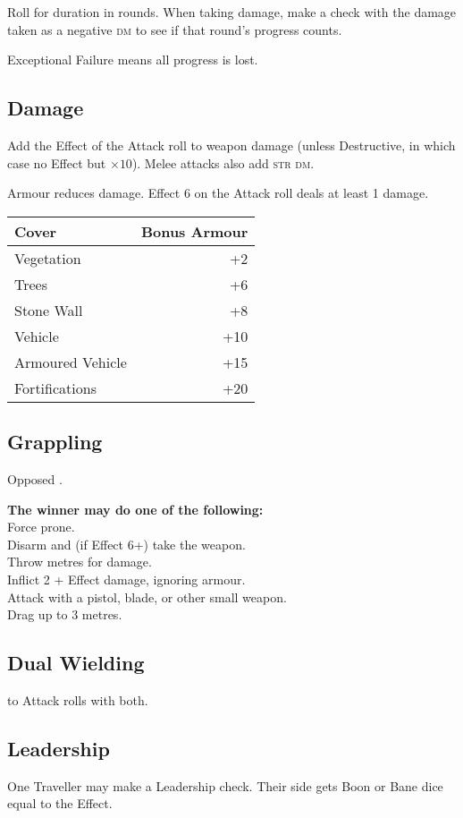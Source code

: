 \documentclass{cheatsheet}
\begin{document}
\begin{multicols}{3}
Roll for duration in rounds.  When taking damage, make a check with
the damage taken as a negative \textsc{dm} to see if that round's
progress counts.

Exceptional Failure means all progress is lost.

\subsection{Damage}

Add the Effect of the Attack roll to weapon damage (unless
Destructive, in which case no Effect but $\times 10$).  Melee attacks
also add \textsc{str} \textsc{dm}.

Armour reduces damage.  Effect 6 on the Attack roll deals at least 1
damage.

\begin{tabularx}{\linewidth}{Xr} \toprule
Cover & Bonus Armour \\ \midrule
Vegetation & +2 \\
Trees & +6 \\
Stone Wall & +8 \\
Vehicle & +10 \\
Armoured Vehicle & +15 \\
Fortifications & +20 \\ \bottomrule
\end{tabularx}

\subsection{Grappling}

Opposed .

\textbf{The winner may do one of the following:}\\
Force prone.\\
Disarm and (if Effect 6+) take the weapon.\\
Throw  metres for  damage.\\
Inflict 2 + Effect damage, ignoring armour.\\
Attack with a pistol, blade, or other small weapon.\\
Drag up to 3 metres.

\subsection{Dual Wielding}

 to Attack rolls with both.

\subsection{Leadership}

One Traveller may make a Leadership check.  Their side gets Boon or
Bane dice equal to the Effect.
\end{multicols}
\end{document}
